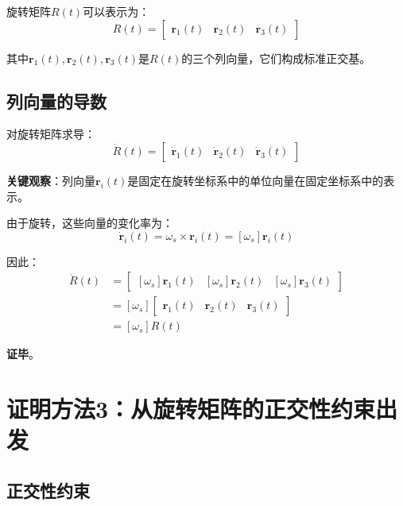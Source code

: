 \documentclass[12pt,a4paper]{article}
\begin{document}
旋转矩阵$R(t)$可以表示为：
\begin{equation}
R(t) = \begin{bmatrix}
\mathbf{r}_1(t) & \mathbf{r}_2(t) & \mathbf{r}_3(t)
\end{bmatrix}
\end{equation}

其中$\mathbf{r}_1(t), \mathbf{r}_2(t), \mathbf{r}_3(t)$是$R(t)$的三个列向量，它们构成标准正交基。

\subsection{列向量的导数}

对旋转矩阵求导：
\begin{equation}
\dot{R}(t) = \begin{bmatrix}
\dot{\mathbf{r}}_1(t) & \dot{\mathbf{r}}_2(t) & \dot{\mathbf{r}}_3(t)
\end{bmatrix}
\end{equation}

\textbf{关键观察}：列向量$\mathbf{r}_i(t)$是固定在旋转坐标系中的单位向量在固定坐标系中的表示。

由于旋转，这些向量的变化率为：
\begin{equation}
\dot{\mathbf{r}}_i(t) = \omega_s \times \mathbf{r}_i(t) = [\omega_s] \mathbf{r}_i(t)
\end{equation}

因此：
\begin{align}
\dot{R}(t) &= \begin{bmatrix}
[\omega_s] \mathbf{r}_1(t) & [\omega_s] \mathbf{r}_2(t) & [\omega_s] \mathbf{r}_3(t)
\end{bmatrix} \\
&= [\omega_s] \begin{bmatrix}
\mathbf{r}_1(t) & \mathbf{r}_2(t) & \mathbf{r}_3(t)
\end{bmatrix} \\
&= [\omega_s] R(t)
\end{align}

\textbf{证毕}。

\section{证明方法3：从旋转矩阵的正交性约束出发}

\subsection{正交性约束}
\end{document}
